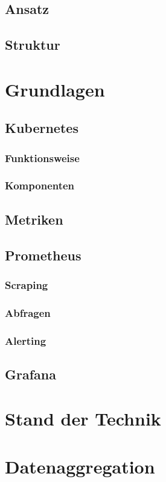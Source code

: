 \documentclass[a4paper,12pt]{scrartcl}
\begin{document}
\subsection{Ansatz}

\subsection{Struktur}

\section{Grundlagen}
\subsection{Kubernetes}
\subsubsection{Funktionsweise}
\subsubsection{Komponenten}
\subsection{Metriken}
\subsection{Prometheus}
\subsubsection{Scraping}
\subsubsection{Abfragen}
\subsubsection{Alerting}
\subsection{Grafana}

\section{Stand der Technik}

\section{Datenaggregation}
\end{document}
